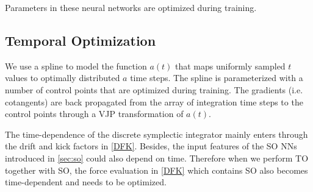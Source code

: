 \documentclass[usenatbib]{mnras}
\begin{document}
Parameters in these neural networks are optimized during training.


\subsection{Temporal Optimization}
\label{sec:to}

We use a spline to model the function $a(t)$ that maps uniformly sampled $t$
values to optimally distributed $a$ time steps.
The spline is parameterized with a number of control points that are optimized
during training.
The gradients (i.e. cotangents) are back propagated from the array of
integration time steps to the control points through a VJP transformation of
$a(t)$.

The time-dependence of the discrete symplectic integrator mainly enters through
the drift and kick factors in \eqref{DFK}.
Besides, the input features of the SO NNs introduced in \autoref{sec:so} could
also depend on time.
Therefore when we perform TO together with SO, the force evaluation in
\eqref{DFK} which contains SO also becomes time-dependent and needs to be
optimized.
\end{document}
